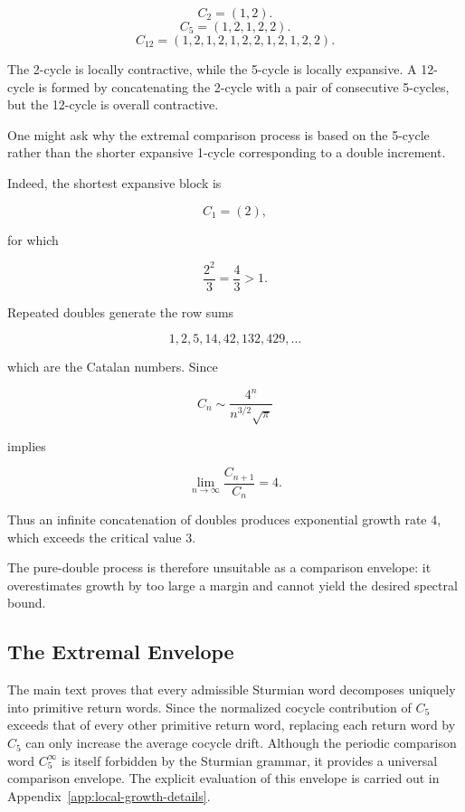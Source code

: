 \documentclass[12pt, oneside]{article}
\numberwithin{equation}{section}
\theoremstyle{definition}
\theoremstyle{plain}
\theoremstyle{remark}
\begin{document}
\[
C_2=(1,2).
\]
\[
C_5=(1,2,1,2,2).
\]
\[
C_{12}=(1,2,1,2,1,2,2,1,2,1,2,2).
\]

The 2-cycle is locally contractive, while the 5-cycle is locally expansive. A 12-cycle
is formed by concatenating the 2-cycle with a pair of consecutive 5-cycles, but the 
12-cycle is overall contractive.

One might ask why the extremal comparison process is based on the
5-cycle rather than the shorter expansive 1-cycle corresponding to a
double increment.

Indeed, the shortest expansive block is

\[
C_1=(2),
\]

for which

\[
\frac{2^2}{3} = \frac43 > 1.
\]

Repeated doubles generate the row sums

\[
1,2,5,14,42,132,429,\ldots
\]

which are the Catalan numbers.
Since

\[
C_n
\sim
\frac{4^n}{n^{3/2}\sqrt{\pi}}
\]

implies

\[
\lim_{n\to\infty}
\frac{C_{n+1}}{C_n}
=
4.
\]

Thus an infinite concatenation of doubles produces exponential growth
rate \(4\), which exceeds the critical value \(3\).

The pure-double process is therefore unsuitable as a comparison
envelope: it overestimates growth by too large a margin and cannot
yield the desired spectral bound.

\subsection{The Extremal Envelope}

The main text proves that every admissible Sturmian word decomposes uniquely
into primitive return words. Since the normalized cocycle contribution of \(C_5\)
exceeds that of every other primitive return word, replacing each return word by \(C_5\)
can only increase the average cocycle drift. Although the periodic comparison word
\(C_5^\infty\) is itself forbidden by the Sturmian grammar, it provides a universal
comparison envelope. The explicit evaluation of this envelope is carried out in 
Appendix~\ref{app:local-growth-details}.

\newpage
\end{document}
